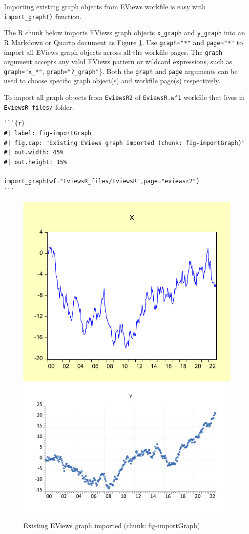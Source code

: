 Importing existing graph objects from EViews workfile is easy with \texttt{import\_graph()} function.

The R chunk below imports EViews graph objects \texttt{x\_graph} and \texttt{y\_graph} into an R Markdown or Quarto document as Figure \ref{fig:fig-importGraph}. Use \texttt{graph="*"} and \texttt{page="*"} to import all EViews graph objects across all the workfile pages. The \texttt{graph} argument accepts any valid EViews pattern or wildcard expressions, such as \texttt{graph="x\_*"}, \texttt{graph="?\_graph"}\}. Both the \texttt{graph} and \texttt{page} arguments can be used to choose specific graph object(s) and workfile page(s) respectively.

To import all graph objects from \texttt{EviewsR2} of \texttt{EviewsR.wf1} workfile that lives in \texttt{EviewsR\_files/} folder:

\begin{verbatim}
```{r} 
#| label: fig-importGraph
#| fig.cap: "Existing EViews graph imported (chunk: fig-importGraph)"
#| out.width: 45%
#| out.height: 15%

import_graph(wf="EviewsR_files/EviewsR",page="eviewsr2")
```
\end{verbatim}

\begin{figure}

{\centering \includegraphics[width=0.45\linewidth,height=0.15\textheight]{figures/fig-importgraph-eviewsr2-x_graph} \includegraphics[width=0.45\linewidth,height=0.15\textheight]{figures/fig-importgraph-eviewsr2-y_graph} 

}

\caption{Existing EViews graph imported (chunk: fig-importGraph)}\label{fig:fig-importGraph}
\end{figure}

